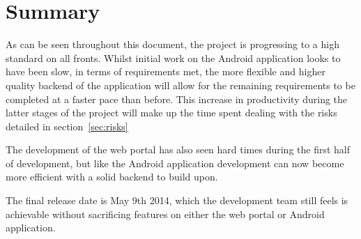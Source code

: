 \documentclass[11pt,a4paper]{article}
\begin{document}
\section{Summary}
\label{sec:summary}
As can be seen throughout this document, the project is progressing to a high standard on all fronts. Whilst initial work on the Android application looks to have been slow, in terms of requirements met, the more flexible and higher quality backend of the application will allow for the remaining requirements to be completed at a faster pace than before. This increase in productivity during the latter stages of the project will make up the time spent dealing with the risks detailed in section~\ref{sec:risks}

The development of the web portal has also seen hard times during the first half of development, but like the Android application development can now become more efficient with a solid backend to build upon.

The final release date is May 9th 2014, which the development team still feels is achievable without sacrificing features on either the web portal or Android application.

\newpage


\end{document}
